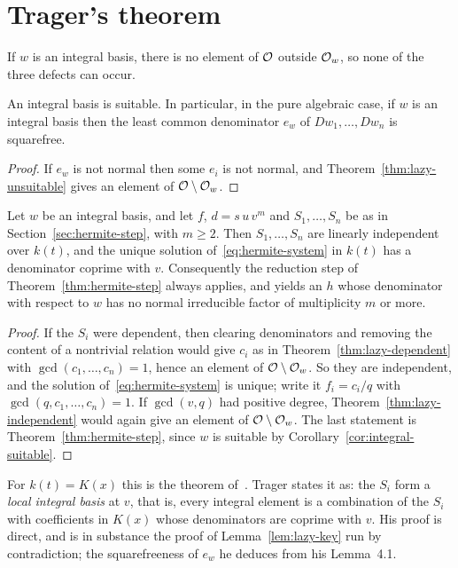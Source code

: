 \section{Trager's theorem}\label{sec:hermite-trager}

If $w$ is an integral basis, there is no element of $\mathcal{O}$ outside $\mathcal{O}_w$, so
none of the three defects can occur.

\begin{corollary}\label{cor:integral-suitable}
An integral basis is suitable. In particular, in the pure algebraic case, if
$w$ is an integral basis then the least common denominator $e_w$ of $Dw_1,
\dots, Dw_n$ is squarefree.
\end{corollary}

\begin{proof}
If $e_w$ is not normal then some $e_i$ is not normal, and
Theorem~\ref{thm:lazy-unsuitable} gives an element of $\mathcal{O} \setminus \mathcal{O}_w$.
\end{proof}

\begin{theorem}[Trager]\label{thm:trager}
Let $w$ be an integral basis, and let $f$, $d = s\,u\,v^m$ and $S_1, \dots,
S_n$ be as in Section~\ref{sec:hermite-step}, with $m \ge 2$. Then $S_1,
\dots, S_n$ are linearly independent over $k(t)$, and the unique solution
of~\eqref{eq:hermite-system} in $k(t)$ has a denominator coprime with $v$.
Consequently the reduction step of Theorem~\ref{thm:hermite-step} always
applies, and yields an $h$ whose denominator with respect to $w$ has no normal
irreducible factor of multiplicity $m$ or more.
\end{theorem}

\begin{proof}
If the $S_i$ were dependent, then clearing denominators and removing the
content of a nontrivial relation would give $c_i$ as in
Theorem~\ref{thm:lazy-dependent} with $\gcd(c_1, \dots, c_n) = 1$, hence an
element of $\mathcal{O} \setminus \mathcal{O}_w$. So they are independent, and the solution
of~\eqref{eq:hermite-system} is unique; write it $f_i = c_i / q$ with $\gcd(q,
c_1, \dots, c_n) = 1$. If $\gcd(v, q)$ had positive degree,
Theorem~\ref{thm:lazy-independent} would again give an element of $\mathcal{O}
\setminus \mathcal{O}_w$. The last statement is Theorem~\ref{thm:hermite-step},
since $w$ is suitable by Corollary~\ref{cor:integral-suitable}.
\end{proof}

For $k(t) = K(x)$ this is the theorem of~\cite[\S4.2]{trager1984}. Trager
states it as: the $S_i$ form a \emph{local integral basis} at $v$, that is,
every integral element is a combination of the $S_i$ with coefficients in
$K(x)$ whose denominators are coprime with $v$. His proof is direct, and is
in substance the proof of Lemma~\ref{lem:lazy-key} run by contradiction; the
squarefreeness of $e_w$ he deduces from his Lemma~4.1.

